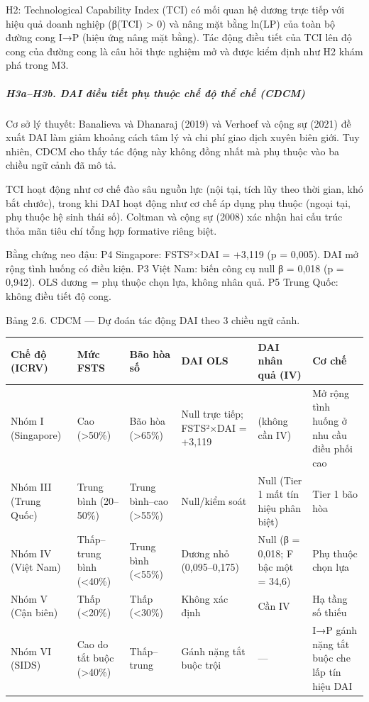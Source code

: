 \documentclass[12pt,a4paper]{article}
\begin{document}
H2: Technological Capability Index (TCI) có mối quan hệ dương trực tiếp
với hiệu quả doanh nghiệp (β(TCI) \textgreater{} 0) và nâng mặt bằng
ln(LP) của toàn bộ đường cong I→P (hiệu ứng nâng mặt bằng). Tác động
điều tiết của TCI lên độ cong của đường cong là câu hỏi thực nghiệm mở
và được kiểm định như H2 khám phá trong M3.

\hypertarget{h3ah3b-dai-ux111iux1ec1u-tiux1ebft-phux1ee5-thuux1ed9c-chux1ebf-ux111ux1ed9-thux1ec3-chux1ebf-cdcm}{%
\subparagraph{H3a--H3b. DAI điều tiết phụ thuộc chế độ thể chế
(CDCM)}\label{h3ah3b-dai-ux111iux1ec1u-tiux1ebft-phux1ee5-thuux1ed9c-chux1ebf-ux111ux1ed9-thux1ec3-chux1ebf-cdcm}}

Cơ sở lý thuyết: Banalieva và Dhanaraj (2019) và Verhoef và cộng sự
(2021) đề xuất DAI làm giảm khoảng cách tâm lý và chi phí giao dịch
xuyên biên giới. Tuy nhiên, CDCM cho thấy tác động này không đồng nhất
mà phụ thuộc vào ba chiều ngữ cảnh đã mô tả.

TCI hoạt động như cơ chế đào sâu nguồn lực (nội tại, tích lũy theo thời
gian, khó bắt chước), trong khi DAI hoạt động như cơ chế áp dụng phụ
thuộc (ngoại tại, phụ thuộc hệ sinh thái số). Coltman và cộng sự (2008)
xác nhận hai cấu trúc thỏa mãn tiêu chí tổng hợp formative riêng biệt.

Bằng chứng neo đậu: P4 Singapore: FSTS²×DAI = +3,119 (p = 0,005). DAI mở
rộng tình huống có điều kiện. P3 Việt Nam: biến công cụ null β = 0,018
(p = 0,942). OLS dương = phụ thuộc chọn lựa, không nhân quả. P5 Trung
Quốc: không điều tiết độ cong.

Bảng 2.6. CDCM --- Dự đoán tác động DAI theo 3 chiều ngữ cảnh.

\begin{longtable}[]{@{}llllll@{}}
\toprule\noalign{}
Chế độ (ICRV) & Mức FSTS & Bão hòa số & DAI OLS & DAI nhân quả (IV) & Cơ
chế \\
\midrule\noalign{}
\endhead
\bottomrule\noalign{}
\endlastfoot
Nhóm I (Singapore) & Cao (\textgreater50\%) & Bão hòa (\textgreater65\%)
& Null trực tiếp; FSTS²×DAI = +3,119 & (không cần IV) & Mở rộng tình
huống ở nhu cầu điều phối cao \\
Nhóm III (Trung Quốc) & Trung bình (20--50\%) & Trung bình--cao
(\textgreater55\%) & Null/kiểm soát & Null (Tier 1 mất tín hiệu phân
biệt) & Tier 1 bão hòa \\
Nhóm IV (Việt Nam) & Thấp--trung bình (\textless40\%) & Trung bình
(\textless55\%) & Dương nhỏ (0,095--0,175) & Null (β = 0,018; F bậc một
= 34,6) & Phụ thuộc chọn lựa \\
Nhóm V (Cận biên) & Thấp (\textless20\%) & Thấp (\textless30\%) & Không
xác định & Cần IV & Hạ tầng số thiếu \\
Nhóm VI (SIDS) & Cao do tắt buộc (\textgreater40\%) & Thấp--trung & Gánh
nặng tắt buộc trội & --- & I→P gánh nặng tắt buộc che lấp tín hiệu
DAI \\
\end{longtable}
\end{document}

